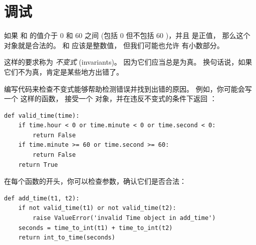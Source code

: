 {%
\section{调试}


如果  和  的值介于 0 和 60 之间
(包括 0 但不包括 60 )，并且  是正值， 那么这个 
对象就是合法的。  和  应该是整数值，
但我们可能也允许   有小数部分。


这样的要求称为 {\em 不变式} (invariants)。 因为它们应当总是为真。
换句话说，如果它们不为真，肯定是某些地方出错了。


编写代码来检查不变式能够帮助检测错误并找到出错的原因。
例如，你可能会写一个  这样的函数，
接受一个  对象，并在违反不变式的条件下返回  ：

\begin{lstlisting}
def valid_time(time):
    if time.hour < 0 or time.minute < 0 or time.second < 0:
        return False
    if time.minute >= 60 or time.second >= 60:
        return False
    return True
\end{lstlisting}

%

在每个函数的开头，你可以检查参数，确认它们是否合法：

  

\begin{lstlisting}
def add_time(t1, t2):
    if not valid_time(t1) or not valid_time(t2):
        raise ValueError('invalid Time object in add_time')
    seconds = time_to_int(t1) + time_to_int(t2)
    return int_to_time(seconds)
\end{lstlisting}

}
